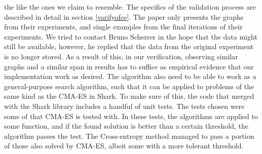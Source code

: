 the like the ones we claim to resemble. The specifics of the validation process
are described in detail in section \ref{varifyofce}. The paper only presents the
graphs from their experiments, and single examples from the final iterations
of their experiments. We tried to contact Bruno Scherrer in the hope that 
the data might still be available, however, he replied that the data from the
original experiment is no longer stored. As a result of this, in our verification,
observing similar graphs and a similar span in results has to suffice as 
empirical evidence that our implementation work as desired. 
The algorithm also need to be able to work as a general-purpose 
search algorithm, such that it can be applied to problems of the same kind as 
the CMA-ES in Shark. To make sure of this, the code that merged with the 
Shark library includes a handful of unit tests. The tests chosen were some
of that CMA-ES is tested with. In these tests, the algorithms are applied to some 
function, and if the found solution is better than a certain threshold, the 
algorithm passes the test. The Cross-entropy method managed to pass a portion 
of those also solved by CMA-ES, albeit some with a more tolerant threshold.



